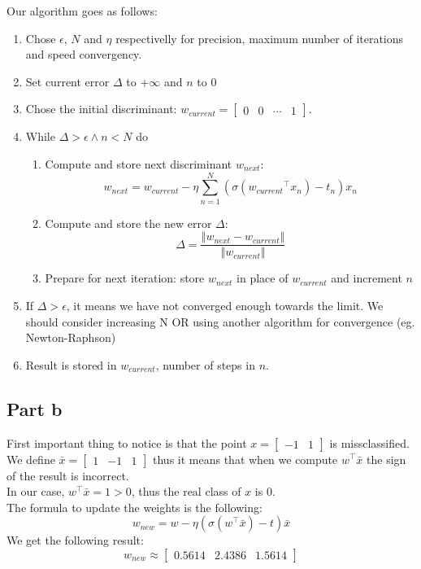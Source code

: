 \documentclass[a4paper, 10pt]{article}
\begin{document}
Our algorithm goes as follows:
\begin{enumerate}
    \item Chose $\epsilon$, $N$ and $\eta$ respectivelly for precision, maximum number of iterations and speed convergency.
    \item Set current error $\Delta$ to $+\infty$ and $n$ to $0$
    \item Chose the initial discriminant: $w_{current} = \begin{bmatrix}0 & 0 & \cdots & 1\end{bmatrix}$.
    \item While $\Delta > \epsilon \wedge n < N$ do
    \begin{enumerate}
        \item Compute and store next discriminant $w_{next}$:
$$
w_{next} = w_{current} - \eta \sum_{n=1}^{N}\left(\sigma({w_{current}}^\top x_n)-t_n\right)x_n
$$
        \item Compute and store the new error $\Delta$:
$$
\Delta = \frac{\left\Vert w_{next} - w_{current}\right\Vert}{\left\Vert w_{current} \right\Vert}
$$
        \item Prepare for next iteration: store $w_{next}$ in place of $w_{current}$ and increment $n$
    \end{enumerate}
    \item If $\Delta > \epsilon$, it means we have not converged enough towards the limit. We should consider increasing N OR using another algorithm for convergence (eg. Newton-Raphson)
    \item Result is stored in $w_{current}$, number of steps in $n$. 
\end{enumerate}

\subsection{Part b}
First important thing to notice is that the point $x=\begin{bmatrix}-1 & 1\end{bmatrix}$ is missclassified.
We define $\bar{x} = \begin{bmatrix}1 & -1 & 1\end{bmatrix}$ thus it means that when we compute 
$w^\top \bar{x}$ the sign of the result is incorrect.
\\
In our case, $w^\top \bar{x} = 1 >0$, thus the real class of $x$ is $0$.
\\
The formula to update the weights is the following:
$$
w_{new} = w - \eta (\sigma(w^\top \bar{x})-t)\bar{x}
$$
We get the following result:
$$
w_{new} \approx \begin{bmatrix}0.5614 & 2.4386 & 1.5614\end{bmatrix}
$$
\end{document}
